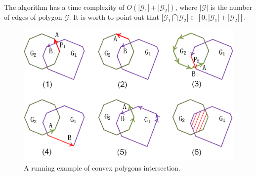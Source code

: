 The algorithm has a time complexity of $O(|\mathcal{G}_1| + |\mathcal{G}_2|)$, where $|\mathcal{G}|$ is the number of edges of polygon $\mathcal{G}$.
It is worth to point out that $|\mathcal{G}_1 \bigcap \mathcal{G}_2| \in [0, |\mathcal{G}_1| + |\mathcal{G}_2|]$.


\begin{figure}[tb!]
\centering
\includegraphics[scale=0.88]{figures/Fig-convex-poly-inter.png}
\vspace{-2ex}
\caption{\small A running example of convex polygons intersection.}
\vspace{-1ex}
\label{fig:c-poly-inter}
\end{figure}



